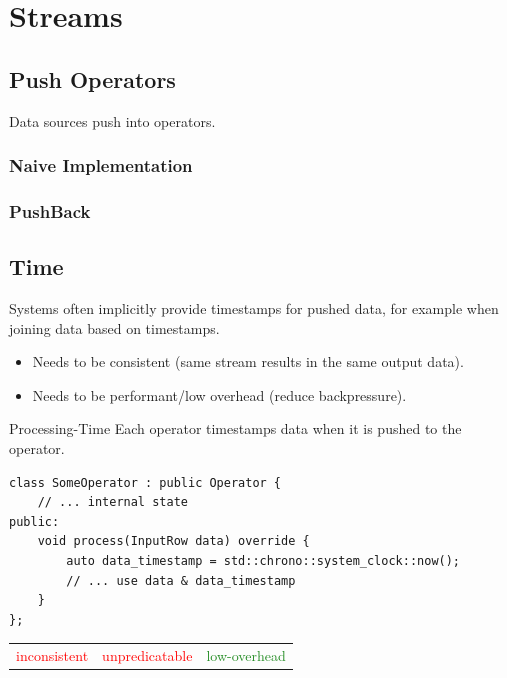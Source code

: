 \chapter{Streams}






\section{Push Operators}
Data sources push into operators.

\subsection{Naive Implementation}


\subsection{PushBack}

\section{Time}
Systems often implicitly provide timestamps for pushed data, for example when joining data based on timestamps.
\begin{itemize}
    \item Needs to be consistent (same stream results in the same output data).
    \item Needs to be performant/low overhead (reduce backpressure).
\end{itemize}

\begin{definitionbox}{Processing-Time}
    Each operator timestamps data when it is pushed to the operator.
    \begin{verbatim}
class SomeOperator : public Operator {
    // ... internal state
public:
    void process(InputRow data) override {
        auto data_timestamp = std::chrono::system_clock::now();
        // ... use data & data_timestamp
    }
};
    \end{verbatim}
    \begin{center}
        \begin{tabular}{c | c | c}
            \textcolor{red}{inconsistent} & \textcolor{red}{unpredicatable} & \textcolor{ForestGreen}{low-overhead} \\
        \end{tabular}
    \end{center}
\end{definitionbox}

